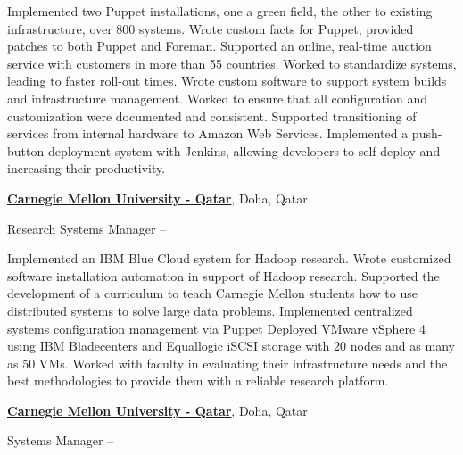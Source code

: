 \documentclass[letterpaper,10pt,oneside]{article}
\begin{document}
\begin{body}
\begin{detail}

\BulletItem
Implemented two Puppet installations, one a green field, the other to existing infrastructure, over 800 systems.
\BulletItem
Wrote custom facts for Puppet, provided patches to both Puppet and Foreman.
\BulletItem
Supported an online, real-time auction service with customers in more than 55 countries. Worked to standardize systems, leading to faster roll-out times.
\BulletItem
Wrote custom software to support system builds and infrastructure management.
\BulletItem
Worked to ensure that all configuration and customization were documented and consistent.
\BulletItem
Supported transitioning of services from internal hardware to Amazon Web Services.
\BulletItem
Implemented a push-button deployment system with Jenkins, allowing developers to self-deploy and increasing their productivity.

\end{detail}
\EntryGap


\href{http://qatar.cmu.edu/}
{\textbf{Carnegie Mellon University - Qatar}},
Doha, Qatar
\par
Research Systems Manager
\hfill
{} -- 

\begin{detail}
\BulletItem
Implemented an IBM Blue Cloud system for Hadoop research.
\BulletItem
Wrote customized software installation automation in support of Hadoop research.
\BulletItem
Supported the development of a curriculum to teach Carnegie Mellon students how to use distributed systems to solve large data problems.
\BulletItem
Implemented centralized systems configuration management via Puppet
\BulletItem
Deployed VMware vSphere 4 using IBM Bladecenters and Equallogic iSCSI storage with 20 nodes and as many as 50 VMs.
\BulletItem
Worked with faculty in evaluating their infrastructure needs and the best methodologies to provide them with a reliable research platform.

\end{detail}
\EntryGap


\href{http://qatar.cmu.edu/}
{\textbf{Carnegie Mellon University - Qatar}},
Doha, Qatar
\par
Systems Manager
\hfill
{} -- 


\end{body}
\end{document}
